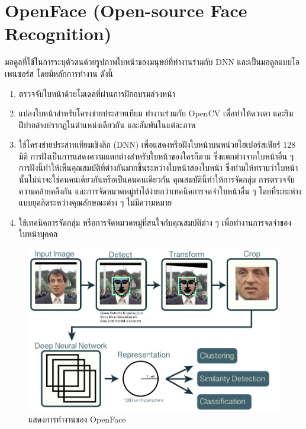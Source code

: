 \section{OpenFace (Open-source Face Recognition)}
มอดูลที่ใช้ในการระบุตัวตนด้วยรูปภาพใบหน้าของมนุษย์ที่ทำงานร่ามกับ DNN และเป็นมอดูลแบบโอเพนซอร์ส \cite{amos2016openface} โดยมีหลักการทำงาน ดังนี้
\begin{enumerate}
  \item ตรวจจับใบหน้าด้วยโมเดลที่ผ่านการฝึกอบรมล่วงหน้า
  \item แปลงใบหน้าสำหรับโครงข่ายประสาทเทียม ทำงานร่วมกับ OpenCV เพื่อทำให้ดวงตา และริมฝีปากล่างปรากฏในตำแหน่งเดียวกัน และสัมพันในแต่ละภาพ
  \item ใช้โครงข่ายประสาทเทียมเชิงลึก (DNN) เพื่อแสดงหรือฝังใบหน้าบนหน่วยไฮเปอร์สเฟียร์ 128 มิติ การฝังเป็นการแสดงความแตกต่างสำหรับใบหน้าของใครก็ตาม 
  ซึ่งแตกต่างจากใบหน้าอื่น ๆ การฝังนี้ทำให้เห็นคุณสมบัติที่ต่างกันมากขึ้นระหว่างใบหน้าสองใบหน้า ซึ่งทำมให้ทราบว่าใบหน้านั้นไม่น่าจะใช่คนคนเดียวกันหรือเป็นคนคนเดียวกัน 
  คุณสมบัตินี้ทำให้การจัดกลุ่ม การตรวจจับความคล้ายคลึงกัน และการจัดหมวดหมู่ทำได้ง่ายกว่าเทคนิคการจดจำใบหน้าอื่น ๆ โดยที่ระยะห่างแบบยุคลิดระหว่างคุณลักษณะต่าง ๆ 
  ไม่มีความหมาย
  \item ใช้เทคนิคการจัดกลุ่ม หรือการจัดหมวดหมู่ที่สนใจกับคุณสมบัติต่าง ๆ เพื่อทำงานการจดจำของใบหน้าบุคคล 
\end{enumerate}  


\begin{figure}[!ht]
  \begin{center}
    \includegraphics[scale=.25]{pic/openface.jpg}
    \caption[Poem]{แสดงการทำงานของ OpenFace}
    \label{fig:opemface}
  \end{center}
\end{figure}



